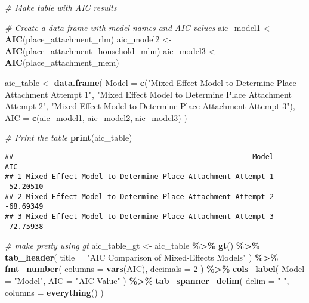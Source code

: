 \documentclass[
]{article}
\newenvironment{Shaded}{\begin{snugshade}}{\end{snugshade}}
\newcommand{\AttributeTok}[1]{\textcolor[rgb]{0.13,0.29,0.53}{#1}}
\newcommand{\CommentTok}[1]{\textcolor[rgb]{0.56,0.35,0.01}{\textit{#1}}}
\newcommand{\DecValTok}[1]{\textcolor[rgb]{0.00,0.00,0.81}{#1}}
\newcommand{\FunctionTok}[1]{\textcolor[rgb]{0.13,0.29,0.53}{\textbf{#1}}}
\newcommand{\NormalTok}[1]{#1}
\newcommand{\OtherTok}[1]{\textcolor[rgb]{0.56,0.35,0.01}{#1}}
\newcommand{\SpecialCharTok}[1]{\textcolor[rgb]{0.81,0.36,0.00}{\textbf{#1}}}
\newcommand{\StringTok}[1]{\textcolor[rgb]{0.31,0.60,0.02}{#1}}
\begin{document}
\begin{Shaded}
\begin{Highlighting}[]
\CommentTok{\# Make table with AIC results }

\CommentTok{\# Create a data frame with model names and AIC values}
\NormalTok{aic\_model1 }\OtherTok{\textless{}{-}} \FunctionTok{AIC}\NormalTok{(place\_attachment\_rlm)}
\NormalTok{aic\_model2 }\OtherTok{\textless{}{-}} \FunctionTok{AIC}\NormalTok{(place\_attachment\_household\_mlm)}
\NormalTok{aic\_model3 }\OtherTok{\textless{}{-}} \FunctionTok{AIC}\NormalTok{(place\_attachment\_mem)}

\NormalTok{aic\_table }\OtherTok{\textless{}{-}} \FunctionTok{data.frame}\NormalTok{(}
  \AttributeTok{Model =} \FunctionTok{c}\NormalTok{(}\StringTok{"Mixed Effect Model to Determine Place Attachment Attempt 1"}\NormalTok{, }
            \StringTok{"Mixed Effect Model to Determine Place Attachment Attempt 2"}\NormalTok{, }
            \StringTok{"Mixed Effect Model to Determine Place Attachment Attempt 3"}\NormalTok{),}
  \AttributeTok{AIC =} \FunctionTok{c}\NormalTok{(aic\_model1, }
\NormalTok{          aic\_model2, }
\NormalTok{          aic\_model3)}
\NormalTok{)}

\CommentTok{\# Print the table}
\FunctionTok{print}\NormalTok{(aic\_table)}
\end{Highlighting}
\end{Shaded}

\begin{verbatim}
##                                                        Model       AIC
## 1 Mixed Effect Model to Determine Place Attachment Attempt 1 -52.20510
## 2 Mixed Effect Model to Determine Place Attachment Attempt 2 -68.69349
## 3 Mixed Effect Model to Determine Place Attachment Attempt 3 -72.75938
\end{verbatim}

\begin{Shaded}
\begin{Highlighting}[]
\CommentTok{\# make pretty using gt}
\NormalTok{aic\_table\_gt }\OtherTok{\textless{}{-}}\NormalTok{ aic\_table }\SpecialCharTok{\%\textgreater{}\%}
  \FunctionTok{gt}\NormalTok{() }\SpecialCharTok{\%\textgreater{}\%}
  \FunctionTok{tab\_header}\NormalTok{(}
    \AttributeTok{title =} \StringTok{"AIC Comparison of Mixed{-}Effects Models"}
\NormalTok{  )  }\SpecialCharTok{\%\textgreater{}\%}
  \FunctionTok{fmt\_number}\NormalTok{(}
    \AttributeTok{columns =} \FunctionTok{vars}\NormalTok{(AIC),}
    \AttributeTok{decimals =} \DecValTok{2}
\NormalTok{  ) }\SpecialCharTok{\%\textgreater{}\%}
  \FunctionTok{cols\_label}\NormalTok{(}
    \AttributeTok{Model =} \StringTok{"Model"}\NormalTok{,}
    \AttributeTok{AIC =} \StringTok{"AIC Value"}
\NormalTok{  ) }\SpecialCharTok{\%\textgreater{}\%}
  \FunctionTok{tab\_spanner\_delim}\NormalTok{(}
    \AttributeTok{delim =} \StringTok{" "}\NormalTok{,}
    \AttributeTok{columns =} \FunctionTok{everything}\NormalTok{()}
\NormalTok{  )}
\end{Highlighting}
\end{Shaded}
\end{document}
